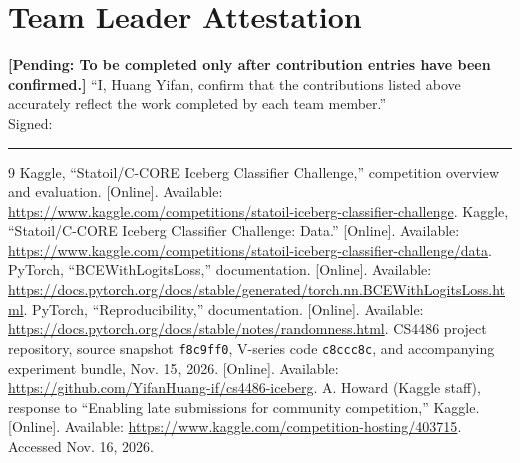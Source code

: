 \documentclass[journal]{IEEEtran}
\newcommand{\pending}[1]{\textbf{[Pending: #1]}}
\begin{document}
\section*{Team Leader Attestation}
\pending{To be completed only after contribution entries have been confirmed.}
``I, Huang Yifan, confirm that the contributions listed above accurately reflect the work completed by each team member.''\\
Signed: \rule{5cm}{0.4pt}

\begin{thebibliography}{9}
 Kaggle, ``Statoil/C-CORE Iceberg Classifier Challenge,'' competition overview and evaluation. [Online]. Available: \url{https://www.kaggle.com/competitions/statoil-iceberg-classifier-challenge}.
 Kaggle, ``Statoil/C-CORE Iceberg Classifier Challenge: Data.'' [Online]. Available: \url{https://www.kaggle.com/competitions/statoil-iceberg-classifier-challenge/data}.
 PyTorch, ``BCEWithLogitsLoss,'' documentation. [Online]. Available: \url{https://docs.pytorch.org/docs/stable/generated/torch.nn.BCEWithLogitsLoss.html}.
 PyTorch, ``Reproducibility,'' documentation. [Online]. Available: \url{https://docs.pytorch.org/docs/stable/notes/randomness.html}.
 CS4486 project repository, source snapshot \texttt{f8c9ff0}, V-series code \texttt{c8ccc8c}, and accompanying experiment bundle, Nov. 15, 2026. [Online]. Available: \url{https://github.com/YifanHuang-if/cs4486-iceberg}.
 A. Howard (Kaggle staff), response to ``Enabling late submissions for community competition,'' Kaggle. [Online]. Available: \url{https://www.kaggle.com/competition-hosting/403715}. Accessed Nov. 16, 2026.
\end{thebibliography}
\end{document}
